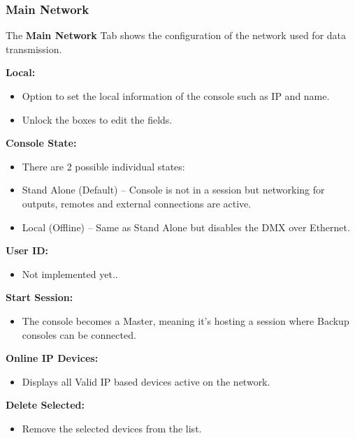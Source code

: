 \documentclass[
]{article}
\providecommand{\tightlist}{%
  \setlength{\itemsep}{0pt}\setlength{\parskip}{0pt}}
\begin{document}
\hypertarget{main-network-1}{%
\subsubsection{Main Network}\label{main-network-1}}

The \textbf{Main Network} Tab shows the configuration of the network used for data transmission.

\textbf{Local:}

\begin{itemize}
\item
  Option to set the local information of the console such as IP and name.
\item
  Unlock the boxes to edit the fields.
\end{itemize}

\textbf{Console State:}

\begin{itemize}
\item
  There are 2 possible individual states:
\item
  Stand Alone (Default) -- Console is not in a session but networking for outputs, remotes and external connections are active.
\item
  Local (Offline) -- Same as Stand Alone but disables the DMX over Ethernet.
\end{itemize}

\textbf{User ID:}

\begin{itemize}
\tightlist
\item
  {Not implemented yet.}.
\end{itemize}

\textbf{Start Session:}

\begin{itemize}
\tightlist
\item
  The console becomes a Master, meaning it's hosting a session where Backup consoles can be connected.
\end{itemize}

\textbf{Online IP Devices:}

\begin{itemize}
\tightlist
\item
  Displays all Valid IP based devices active on the network.
\end{itemize}

\textbf{Delete Selected:}

\begin{itemize}
\tightlist
\item
  Remove the selected devices from the list.
\end{itemize}
\end{document}
